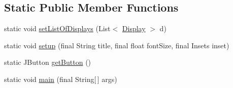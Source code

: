 \subsection*{Static Public Member Functions}
\begin{DoxyCompactItemize}
\item 
static void \hyperlink{classgov_1_1fnal_1_1ppd_1_1dd_1_1IdentifyAll_a481aeb17dac457f3707e55e440c7acd7}{set\-List\-Of\-Displays} (List$<$ \hyperlink{interfacegov_1_1fnal_1_1ppd_1_1dd_1_1signage_1_1Display}{Display} $>$ d)
\item 
static void \hyperlink{classgov_1_1fnal_1_1ppd_1_1dd_1_1IdentifyAll_a16820458eeb294d8ad601a7ae37bb43f}{setup} (final String title, final float font\-Size, final Insets inset)
\item 
static J\-Button \hyperlink{classgov_1_1fnal_1_1ppd_1_1dd_1_1IdentifyAll_a688124fec7e6167e589c184e045b83ac}{get\-Button} ()
\item 
static void \hyperlink{classgov_1_1fnal_1_1ppd_1_1dd_1_1IdentifyAll_ac4a1086e71fcfe522dc76b8788223d45}{main} (final String\mbox{[}$\,$\mbox{]} args)
\end{DoxyCompactItemize}


